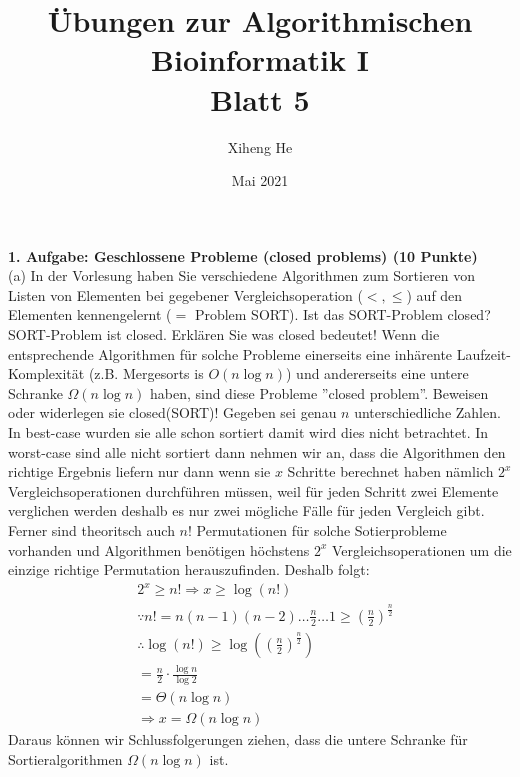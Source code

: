 \documentclass{article}
\title{Übungen zur Algorithmischen Bioinformatik I\\
Blatt 5}
\author{Xiheng He }
\date{Mai 2021}
\begin{document}
\maketitle
\begin{flushleft}
\textbf{1. Aufgabe: Geschlossene Probleme (closed problems) (10 Punkte)}\\
(a) In der Vorlesung haben Sie verschiedene Algorithmen zum Sortieren von Listen von Elementen
bei gegebener Vergleichsoperation ($<, \leq$) auf den Elementen kennengelernt ($=$ Problem SORT).
\newline
Ist das SORT-Problem closed?
\newline
SORT-Problem ist closed.
\newline
Erklären Sie was closed bedeutet!
\newline
Wenn die entsprechende Algorithmen für solche Probleme einerseits eine inhärente Laufzeit-Komplexität (z.B. Mergesorts is $O(n\log n)$) 
und andererseits eine untere Schranke $\Omega(n\log n)$ haben, sind diese Probleme ”closed problem”. 
\newline
Beweisen oder widerlegen sie closed(SORT)!
\newline
Gegeben sei genau $n$ unterschiedliche Zahlen. In best-case wurden sie alle schon sortiert damit 
wird dies nicht betrachtet. In worst-case sind alle nicht sortiert dann nehmen wir an, dass die Algorithmen 
den richtige Ergebnis liefern nur dann wenn sie $x$ Schritte berechnet haben nämlich $2^x$ Vergleichsoperationen durchführen müssen,
weil für jeden Schritt zwei Elemente verglichen werden deshalb es nur zwei mögliche Fälle für jeden Vergleich gibt. 
\newline  
Ferner sind theoritsch auch $n!$ Permutationen für solche Sotierprobleme vorhanden und Algorithmen benötigen höchstens 
$2^x$ Vergleichsoperationen um die einzige richtige Permutation herauszufinden. Deshalb folgt:
\begin{align*}
    & 2^x  \geq n! \Longrightarrow x \geq \log(n!) \\
    & \because n! = n(n-1)(n-2) \dots \frac{n}{2} \dots 1 \geq (\frac{n}{2})^{\frac{n}{2}} \\
    & \therefore \log(n!) \geq \log((\frac{n}{2})^{\frac{n}{2}}) \\
    &= \frac{n}{2} \cdot \frac{\log n}{\log 2} \\
    &= \Theta(n\log n) \\
    & \Longrightarrow x = \Omega(n\log n)
\end{align*}
Daraus können wir Schlussfolgerungen ziehen, dass die untere Schranke für Sortieralgorithmen $\Omega(n\log n)$ ist.

\end{flushleft}
\end{document}
